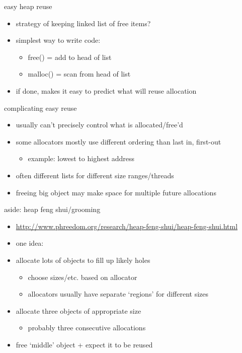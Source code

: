 \begin{frame}{easy heap reuse}
    \begin{itemize}
    \item strategy of keeping linked list of free items?
    \item simplest way to write code:
        \begin{itemize}
        \item free() = add to head of list
        \item malloc() = scan from head of list
        \end{itemize}
    \item if done, makes it easy to predict what will reuse allocation
    \end{itemize}
\end{frame}

\begin{frame}{complicating easy reuse}
    \begin{itemize}
    \item usually can't precisely control what is allocated/free'd
    \item some allocators mostly use different ordering than last in, first-out
        \begin{itemize}
        \item example: lowest to highest address
        \end{itemize}
    \item often different lists for different size ranges/threads
    \item freeing big object may make space for multiple future allocations
    \end{itemize}
\end{frame}

\begin{frame}{aside: heap feng shui/grooming}
    \begin{itemize}
    \item \url{http://www.phreedom.org/research/heap-feng-shui/heap-feng-shui.html}
    \item one idea:
    \item allocate lots of objects to fill up likely holes
        \begin{itemize}
        \item choose sizes/etc. based on allocator
        \item allocators usually have separate `regions' for different sizes
        \end{itemize}
    \item allocate three objects of appropriate size
        \begin{itemize}
        \item probably three consecutive allocations
        \end{itemize}
    \item free `middle' object + expect it to be reused
    \end{itemize}
\end{frame}
